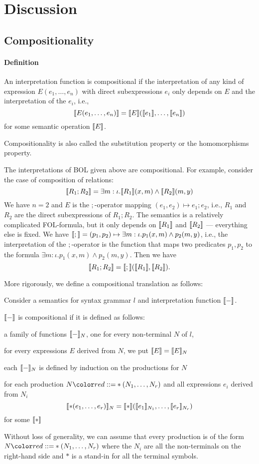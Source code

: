\section{Discussion}

\subsection{Compositionality}\label{sec:compositionality}

\paragraph{Definition}
An interpretation function is compositional if the interpretation of any kind of expression $E(e_1,\ldots,e_n)$ with direct subexpressions $e_i$ only depends on $E$ and the interpretation of the $e_i$, i.e., \[\llbracket E(e_1,\ldots,e_n)\rrbracket=\llbracket E\rrbracket(\llbracket e_1\rrbracket,\ldots,\llbracket e_n\rrbracket)\] for some semantic operation $\llbracket E\rrbracket$.

Compositionality is also called the substitution property or the homomorphisms property.

The interpretations of BOL given above are compositional.
For example, consider the case of composition of relations:
 \[\llbracket R_1 ; R_2\rrbracket= \exists m:\iota.\llbracket R_1\rrbracket(x,m)\wedge \llbracket R_2\rrbracket(m,y)\]
We have $n=2$ and $E$ is the $;$-operator mapping $(e_1,e_2)\mapsto e_1;e_2$, i.e., $R_1$ and $R_2$ are the direct subexpressions of $R_1;R_2$.
The semantics is a relatively complicated FOL-formula, but it only depends on $\llbracket R_1\rrbracket$ and $\llbracket R_2\rrbracket$ --- everything else is fixed.
We have $\llbracket ;\rrbracket=(p_1,p_2)\mapsto \exists m:\iota.p_1(x,m)\wedge p_2(m,y)$, i.e., the interpretation of the $;$-operator is the function that maps two predicates $p_1,p_2$ to the formula $\exists m:\iota.p_1(x,m)\wedge p_2(m,y)$.
Then we have \[\llbracket R_1;R_2\rrbracket=\llbracket ;\rrbracket(\llbracket R_1\rrbracket,\llbracket R_2\rrbracket).\]


More rigorously, we define a compositional translation as follows:
\begin{definition}
Consider a semantics for syntax grammar $l$ and interpretation function $\llbracket -\rrbracket$.

$\llbracket -\rrbracket$ is compositional if it is defined as follows:
\begin{compactitem}
 \item a family of functions $\llbracket -\rrbracket_N$, one for every non-terminal $N$ of $l$,
 \item for every expressions $E$ derived from $N$, we put $\llbracket E\rrbracket=\llbracket E\rrbracket_N$
 \item each $\llbracket -\rrbracket_N$ is defined by induction on the productions for $N$
 \item for each production $N\bbc *(N_1,\ldots,N_r)$ and all expressions $e_i$ derived from $N_i$
   \[\llbracket *(e_1,\ldots,e_r)\rrbracket_N=\llbracket *\rrbracket(\llbracket e_1\rrbracket_{N_1},\ldots,\llbracket e_r\rrbracket_{N_r})\]
   for some $\llbracket *\rrbracket$
\end{compactitem}

Without loss of generality, we can assume that every production is of the form $N\bbc *(N_1,\ldots,N_r)$ where the $N_i$ are all the non-terminals on the right-hand side and $*$ is a stand-in for all the terminal symbols.
\end{definition}

